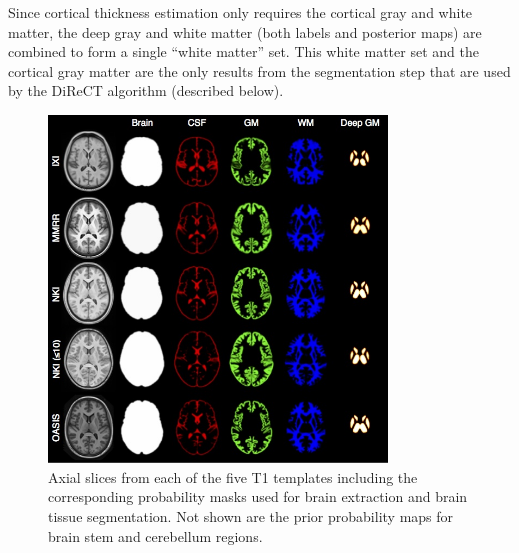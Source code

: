 Since cortical thickness estimation only requires the cortical gray
and white matter, the deep gray and white matter
(both labels and posterior maps) are combined to form a single
``white matter'' set.  This white matter set and the cortical
gray matter are the only results from the segmentation
step that are used by the DiReCT algorithm (described below).

\begin{figure}
  \centering
  \includegraphics[width=90mm]{Figures/templateProbabilityMasks.jpg}
  \caption{Axial slices from each of the five T1 templates including the corresponding
  probability masks used for brain extraction and brain tissue segmentation.  Not shown
  are the prior probability maps for brain stem and cerebellum regions.
  }
  \label{fig:templateMasks}
\end{figure}


